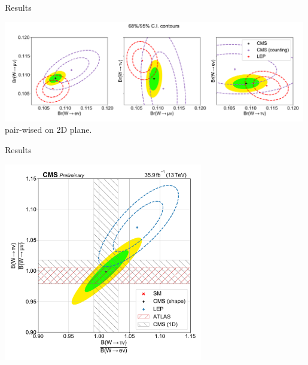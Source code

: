 \begin{frame}{Results}
    \begin{center}
    \includegraphics[width=0.99\textwidth]{chapters/Analysis/sectionResult/figures/result_contours_2d.pdf}
    pair-wised \BWl on 2D plane.
    \end{center}
\end{frame}

\begin{frame}{Results}
    \begin{center}
        \includegraphics[width=0.65\textwidth]{chapters/Analysis/sectionResult/figures/result_contours_2d_ratio.pdf}
    \end{center}
\end{frame}




